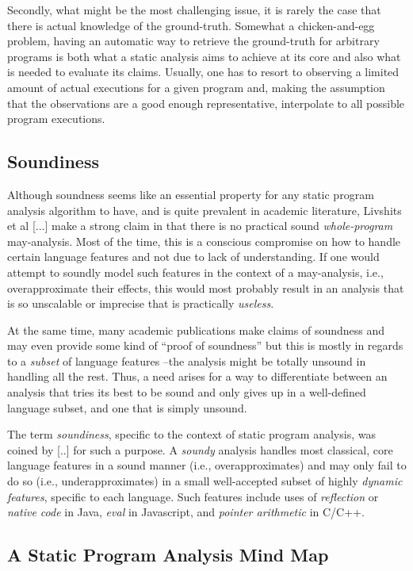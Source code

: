 Secondly, what might be the most challenging issue, it is rarely the case that there is actual knowledge of the ground-truth. Somewhat a chicken-and-egg problem, having an automatic way to retrieve the ground-truth for arbitrary programs is both what a static analysis aims to achieve at its core and also what is needed to evaluate its claims. Usually, one has to resort to observing a limited amount of actual executions for a given program and, making the assumption that the observations are a good enough representative, interpolate to all possible program executions.

\subsection{Soundiness}

Although soundness seems like an essential property for any static program analysis algorithm to have, and is quite prevalent in academic literature, Livshits et al [...] make a strong claim in that there is no practical sound \emph{whole-program} may-analysis. Most of the time, this is a conscious compromise on how to handle certain language features and not due to lack of understanding. If one would attempt to soundly model such features in the context of a may-analysis, i.e., overapproximate their effects, this would most probably result in an analysis that is so unscalable or imprecise that is practically \emph{useless}.

At the same time, many academic publications make claims of soundness and may even provide some kind of ``proof of soundness'' but this is mostly in regards to a \emph{subset} of language features --the analysis might be totally unsound in handling all the rest. Thus, a need arises for a way to differentiate between an analysis that tries its best to be sound and only gives up in a well-defined language subset, and one that is simply unsound.

The term \emph{soundiness}, specific to the context of static program analysis, was coined by [..] for such a purpose. A \emph{soundy} analysis handles most classical, core language features in a sound manner (i.e., overapproximates) and may only fail to do so (i.e., underapproximates) in a small well-accepted subset of highly \emph{dynamic features}, specific to each language. Such features include uses of \emph{reflection} or \emph{native code} in Java, \emph{eval} in Javascript, and \emph{pointer arithmetic} in C/C++.

\subsection{A Static Program Analysis Mind Map}

